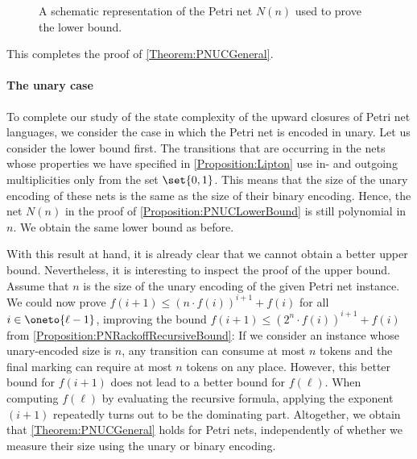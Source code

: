 \documentclass[../../diss.tex]{subfiles}
\begin{document}
\begin{figure}
    \centering%
    \caption{A schematic representation of the Petri net $N(n)$ used to prove the lower bound.}%
    \label{Figure:PNUCLowerBound}%
\end{figure}

This completes the proof of \cref{Theorem:PNUCGeneral}.

\paragraph{The unary case}

To complete our study of the state complexity of the upward closures of Petri net languages, we consider the case in which the Petri net is encoded in unary.
Let us consider the lower bound first.
The transitions that are occurring in the nets whose properties we have specified in \cref{Proposition:Lipton} use in- and outgoing multiplicities only from the set $\set{0,1}$.
This means that the size of the unary encoding of these nets is the same as the size of their binary encoding.
Hence, the net $N(n)$ in the proof of \cref{Proposition:PNUCLowerBound} is still polynomial in $n$.
We obtain the same lower bound as before.

With this result at hand, it is already clear that we cannot obtain a better upper bound.
Nevertheless, it is interesting to inspect the proof of the upper bound.
Assume that $n$ is the size of the unary encoding of the given Petri net instance.
We could now prove $f(i+1) \leq {(n \cdot f(i))}^{i+1} + f(i)$ for all $i\in \oneto{\ell-1}$, improving the bound $f(i+1) \leq {(2^n \cdot f(i))}^{i+1} + f(i)$ from \cref{Proposition:PNRackoffRecursiveBound}:
If we consider an instance whose unary-encoded size is $n$, any transition can consume at most $n$ tokens and the final marking can require at most $n$ tokens on any place.
However, this better bound for $f(i+1)$ does not lead to a better bound for $f(\ell)$.
When computing $f(\ell)$ by evaluating the recursive formula, applying the exponent $(i+1)$ repeatedly turns out to be the dominating part.
Altogether, we obtain that \cref{Theorem:PNUCGeneral} holds for Petri nets, independently of whether we measure their size using the unary or binary encoding.
\end{document}
